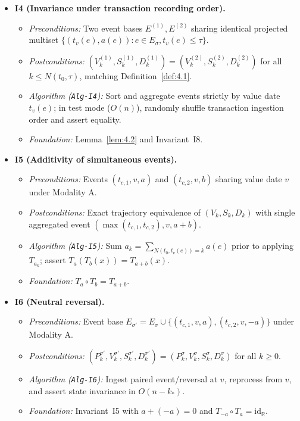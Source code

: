 \documentclass[11pt, a4paper]{article}
\theoremstyle{definition}
\theoremstyle{plain}
\theoremstyle{remark}
\begin{document}
\begin{itemize}
    \item \textbf{I4 (Invariance under transaction recording order).}
    \begin{itemize}
        \item \emph{Preconditions:} Two event bases $E^{(1)}, E^{(2)}$ sharing identical projected multiset $\{(t_v(e), a(e)) : e \in E_\sigma, t_v(e) \le \tau\}$.
        \item \emph{Postconditions:} $(V_k^{(1)}, S_k^{(1)}, D_k^{(1)}) = (V_k^{(2)}, S_k^{(2)}, D_k^{(2)})$ for all $k \le N(t_0, \tau)$, matching Definition~\ref{def:4.1}.
        \item \emph{Algorithm (\texttt{Alg-I4}):} Sort and aggregate events strictly by value date $t_v(e)$; in test mode ($O(n)$), randomly shuffle transaction ingestion order and assert equality.
        \item \emph{Foundation:} Lemma~\ref{lem:4.2} and Invariant~I8.
    \end{itemize}

    \item \textbf{I5 (Additivity of simultaneous events).}
    \begin{itemize}
        \item \emph{Preconditions:} Events $(t_{c,1}, v, a)$ and $(t_{c,2}, v, b)$ sharing value date $v$ under Modality A.
        \item \emph{Postconditions:} Exact trajectory equivalence of $(V_k, S_k, D_k)$ with single aggregated event $(\max(t_{c,1}, t_{c,2}), v, a + b)$.
        \item \emph{Algorithm (\texttt{Alg-I5}):} Sum $a_k = \sum_{N(t_0, t_v(e))=k} a(e)$ prior to applying $T_{a_k}$; assert $T_a(T_b(x)) = T_{a+b}(x)$.
        \item \emph{Foundation:} $T_a \circ T_b = T_{a+b}$.
    \end{itemize}

    \item \textbf{I6 (Neutral reversal).}
    \begin{itemize}
        \item \emph{Preconditions:} Event base $E_{\sigma'} = E_\sigma \cup \{(t_{c,1}, v, a), (t_{c,2}, v, -a)\}$ under Modality A.
        \item \emph{Postconditions:} $(P_k^{\sigma'}, V_k^{\sigma'}, S_k^{\sigma'}, D_k^{\sigma'}) = (P_k^\sigma, V_k^\sigma, S_k^\sigma, D_k^\sigma)$ for all $k \ge 0$.
        \item \emph{Algorithm (\texttt{Alg-I6}):} Ingest paired event/reversal at $v$, reprocess from $v$, and assert state invariance in $O(n - k_*)$.
        \item \emph{Foundation:} Invariant~I5 with $a + (-a) = 0$ and $T_{-a} \circ T_a = \mathrm{id}_{\mathbb{R}}$.
    \end{itemize}
\end{itemize}
\end{document}
